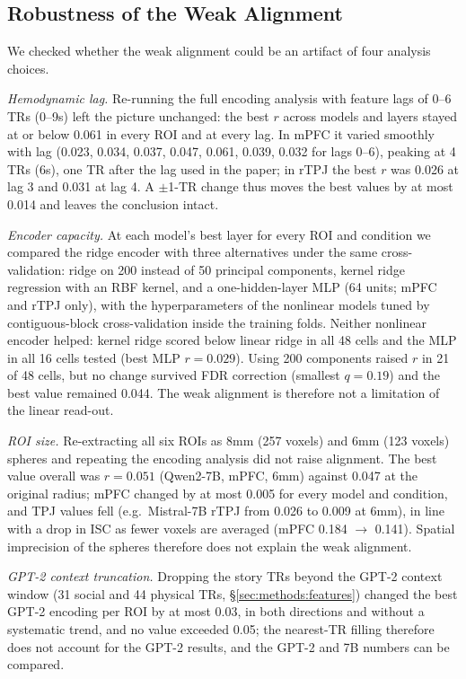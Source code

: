 \documentclass[conference]{IEEEtran}
\begin{document}
\subsection{Robustness of the Weak Alignment}
\label{sec:robust}

We checked whether the weak alignment could be an artifact of four analysis choices.

\textit{Hemodynamic lag.} Re-running the full encoding analysis with feature lags of 0--6 TRs (0--9s) left the picture unchanged: the best $r$ across models and layers stayed at or below 0.061 in every ROI and at every lag. In mPFC it varied smoothly with lag (0.023, 0.034, 0.037, 0.047, 0.061, 0.039, 0.032 for lags 0--6), peaking at 4 TRs (6s), one TR after the lag used in the paper; in rTPJ the best $r$ was 0.026 at lag 3 and 0.031 at lag 4. A $\pm$1-TR change thus moves the best values by at most 0.014 and leaves the conclusion intact.

\textit{Encoder capacity.} At each model's best layer for every ROI and condition we compared the ridge encoder with three alternatives under the same cross-validation: ridge on 200 instead of 50 principal components, kernel ridge regression with an RBF kernel, and a one-hidden-layer MLP (64 units; mPFC and rTPJ only), with the hyperparameters of the nonlinear models tuned by contiguous-block cross-validation inside the training folds. Neither nonlinear encoder helped: kernel ridge scored below linear ridge in all 48 cells and the MLP in all 16 cells tested (best MLP $r = 0.029$). Using 200 components raised $r$ in 21 of 48 cells, but no change survived FDR correction (smallest $q = 0.19$) and the best value remained 0.044. The weak alignment is therefore not a limitation of the linear read-out.

\textit{ROI size.} Re-extracting all six ROIs as 8mm (257 voxels) and 6mm (123 voxels) spheres and repeating the encoding analysis did not raise alignment. The best value overall was $r = 0.051$ (Qwen2-7B, mPFC, 6mm) against 0.047 at the original radius; mPFC changed by at most 0.005 for every model and condition, and TPJ values fell (e.g.\ Mistral-7B rTPJ from 0.026 to 0.009 at 6mm), in line with a drop in ISC as fewer voxels are averaged (mPFC 0.184 $\rightarrow$ 0.141). Spatial imprecision of the spheres therefore does not explain the weak alignment.

\textit{GPT-2 context truncation.} Dropping the story TRs beyond the GPT-2 context window (31 social and 44 physical TRs, \S\ref{sec:methods:features}) changed the best GPT-2 encoding per ROI by at most 0.03, in both directions and without a systematic trend, and no value exceeded 0.05; the nearest-TR filling therefore does not account for the GPT-2 results, and the GPT-2 and 7B numbers can be compared.
\end{document}
